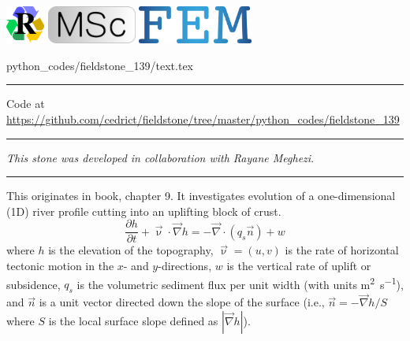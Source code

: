 \includegraphics[height=1.25cm]{images/pictograms/replication}
\includegraphics[height=1.25cm]{images/pictograms/msc}
\includegraphics[height=1.25cm]{images/pictograms/FEM}


\begin{flushright} {\tiny {\color{gray} python\_codes/fieldstone\_139/text.tex}} \end{flushright}



\par\noindent\rule{\textwidth}{0.4pt}

\begin{center}
Code at \url{https://github.com/cedrict/fieldstone/tree/master/python_codes/fieldstone_139}
\end{center}

\par\noindent\rule{\textwidth}{0.4pt}

{\sl This stone was developed in collaboration with Rayane Meghezi}. 

\par\noindent\rule{\textwidth}{0.4pt}
















This \stone originates in \textcite{simp17} book, chapter 9.
It investigates evolution of a one-dimensional (1D) river profile cutting into an uplifting
block of crust.
\[
\frac{\partial h}{\partial t} + \vec{\upnu}\cdot \vec{\nabla} h = -\vec\nabla \cdot (q_s \vec{n}) + w
\]
where $h$ is the elevation of the topography, $\vec\upnu=(u,v)$ is the rate of horizontal tectonic 
motion in the
$x$- and $y$-directions, $w$ is the vertical rate of uplift or subsidence, $q_s$ is the volumetric
sediment flux per unit width (with units \si{\square\meter\per\second}), and 
$\vec{n}$ is a unit vector directed down the slope of
the surface (i.e., $\vec{n} = -\vec\nabla h/S$ where $S$ is the local surface slope defined 
as $|\vec\nabla h|$).

